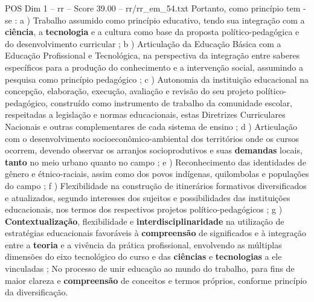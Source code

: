 \begin{textsample}{POS Dim 1 – rr – Score 39.00 – rr/rr\_em\_54.txt}
Portanto, como princípio tem -se : a ) Trabalho assumido como princípio educativo, tendo sua integração com a \textbf{ciência}, a \textbf{tecnologia} e a cultura como base da proposta político-pedagógica e do desenvolvimento curricular ; b ) Articulação da Educação Básica com a Educação Profissional e Tecnológica, na perspectiva da integração entre saberes específicos para a produção do conhecimento e a intervenção social, assumindo a pesquisa como princípio pedagógico ; c ) Autonomia da instituição educacional na concepção, elaboração, execução, avaliação e revisão do seu projeto político-pedagógico, construído como instrumento de trabalho da comunidade escolar, respeitadas a legislação e normas educacionais, estas Diretrizes Curriculares Nacionais e outras complementares de cada sistema de ensino ; d ) Articulação com o desenvolvimento socioeconômico-ambiental dos territórios onde os cursos ocorrem, devendo observar os arranjos socioprodutivos e suas \textbf{demandas} locais, \textbf{tanto} no meio urbano quanto no campo ; e ) Reconhecimento das identidades de gênero e étnico-raciais, assim como dos povos indígenas, quilombolas e populações do campo ; f ) Flexibilidade na construção de itinerários formativos diversificados e atualizados, segundo interesses dos sujeitos e possibilidades das instituições educacionais, nos termos dos respectivos projetos político-pedagógicos ; g ) \textbf{Contextualização}, flexibilidade e \textbf{interdisciplinaridade} na utilização de estratégias educacionais favoráveis à \textbf{compreensão} de significados e à integração entre a \textbf{teoria} e a vivência da prática profissional, envolvendo as múltiplas dimensões do eixo tecnológico do curso e das \textbf{ciências} e \textbf{tecnologias} a ele vinculadas ; No processo de unir educação ao mundo do trabalho, para fins de maior clareza e \textbf{compreensão} de conceitos e termos próprios, conforme princípio da diversificação.

\end{textsample}
